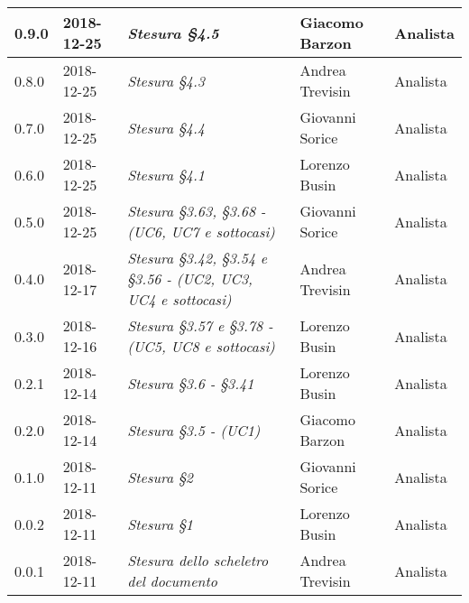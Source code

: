 \begin{longtable}{C{2cm}|C{2.5cm}|C{4.5cm}|C{2.5cm}|C{3cm}}
		0.9.0 & 2018-12-25 & \emph{Stesura §4.5} & Giacomo Barzon & Analista \\
		\hline
		
		0.8.0 & 2018-12-25 & \emph{Stesura §4.3} & Andrea Trevisin & Analista \\
		\hline
		
		0.7.0 & 2018-12-25 & \emph{Stesura §4.4} & Giovanni Sorice & Analista \\
		\hline
		
		0.6.0 & 2018-12-25 & \emph{Stesura §4.1} & Lorenzo Busin & Analista \\
		\hline
		
		0.5.0 & 2018-12-25 & \emph{Stesura §3.63, §3.68 - (UC6, UC7 e sottocasi)} & Giovanni Sorice & Analista \\
		\hline
		
		0.4.0 & 2018-12-17 & \emph{Stesura §3.42, §3.54 e §3.56 - (UC2, UC3, UC4 e sottocasi)} & Andrea Trevisin & Analista \\
		\hline
		
		0.3.0 & 2018-12-16 & \emph{Stesura §3.57 e §3.78 - (UC5, UC8 e sottocasi)} & Lorenzo Busin & Analista \\
		\hline
		
		0.2.1 & 2018-12-14 & \emph{Stesura §3.6 - §3.41} & Lorenzo Busin & Analista \\
		\hline
		
		0.2.0 & 2018-12-14 & \emph{Stesura §3.5 - (UC1)} & Giacomo Barzon & Analista \\
		\hline
		
		0.1.0 & 2018-12-11 & \emph{Stesura §2} & Giovanni Sorice & Analista \\
		\hline
		
		0.0.2 & 2018-12-11 & \emph{Stesura §1} & Lorenzo Busin & Analista \\
		\hline
		
		0.0.1 & 2018-12-11 & \emph{Stesura dello scheletro del documento} & Andrea Trevisin & Analista \\
		
	\end{longtable}



\clearpage